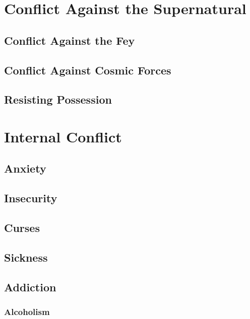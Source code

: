 \documentclass[twocolumn]{dndbook}
\begin{document}
\chapter{Conflict Against the Supernatural}
\section{Conflict Against the Fey}

\section{Conflict Against Cosmic Forces}

\section{Resisting Possession}


\chapter{Internal Conflict}
\section{Anxiety}
\section{Insecurity}
\section{Curses}
\section{Sickness}
\section{Addiction}
\subsection{Alcoholism}
\end{document}
